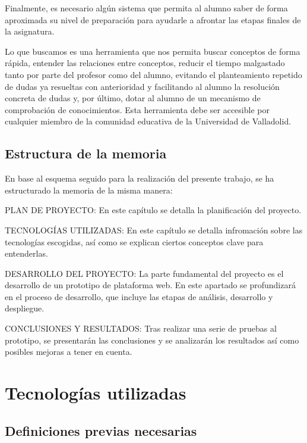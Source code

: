 \documentclass[openright,twoside,10pt]{book}
\begin{document}
    Finalmente, es necesario algún sistema que permita al alumno saber de
    forma aproximada su nivel de preparación para ayudarle a afrontar las
    etapas finales de la asignatura.
    
    Lo que buscamos es una herramienta que nos permita buscar conceptos de
    forma rápida, entender las relaciones entre conceptos, reducir el tiempo
    malgastado tanto por parte del profesor como del alumno, evitando el
    planteamiento repetido de dudas ya resueltas con anterioridad y
    facilitando al alumno la resolución concreta de dudas y, por último,
    dotar al alumno de un mecanismo de comprobación de conocimientos. Esta
    herramienta debe ser accesible por cualquier miembro de la comunidad
    educativa de la Universidad de Valladolid.
    
    \section{Estructura de la memoria}\label{estructura-de-la-memoria}
    
    En base al esquema seguido para la realización del presente trabajo, se
    ha estructurado la memoria de la misma manera:
    
    PLAN DE PROYECTO: En este capítulo se detalla la planificación del
    proyecto.
    
    TECNOLOGÍAS UTILIZADAS: En este capítulo se detalla infromación sobre
    las tecnologías escogidas, así como se explican ciertos conceptos clave
    para entenderlas.
    
    DESARROLLO DEL PROYECTO: La parte fundamental del proyecto es el
    desarrollo de un prototipo de plataforma web. En este apartado se
    profundizará en el proceso de desarrollo, que incluye las etapas de
    análisis, desarrollo y despliegue.
    
    CONCLUSIONES Y RESULTADOS: Tras realizar una serie de pruebas al
    prototipo, se presentarán las conclusiones y se analizarán los
    resultados así como posibles mejoras a tener en cuenta.
    
    \chapter{ Tecnologías utilizadas }
    
    \section{Definiciones previas
    necesarias}\label{definiciones-previas-necesarias}
    
\end{document}
